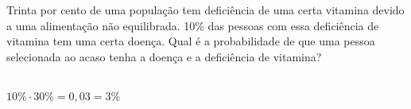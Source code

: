 \begin{ex}
Trinta por cento de uma população tem deficiência de uma certa vitamina devido a uma alimentação não equilibrada. 10\% das pessoas com essa deficiência de vitamina tem uma certa doença. Qual é a probabilidade de que uma pessoa selecionada ao acaso tenha a doença e a deficiência de vitamina?
  \begin{sol}
    \phantom{A}  \\
    $10\%\cdot30\%=0,03=3\%$
  \end{sol}
\end{ex}